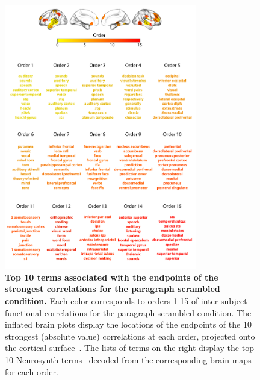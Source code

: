 \documentclass{article}
\begin{document}
\begin{figure}[p!]
\centering
\includegraphics[width=0.75\textwidth]{figs/supp_15_paragraph}
\caption{\textbf{Top 10 terms associated with the endpoints of the
      strongest correlations for the paragraph scrambled condition.}  Each color corresponds to orders 1-15 of
    inter-subject functional correlations for the paragraph scrambled condition. The inflated brain plots
    display the locations of the endpoints of the 10 strongest
    (absolute value) correlations at each order, projected onto the
    cortical surface~\citep{CombEtal19}.  The lists of terms on the
    right display the top 10 Neurosynth terms~\citep{RubiEtal17}
    decoded from the corresponding brain maps for each order.}
\label{fig:paragraph}
\end{figure}
\end{document}
